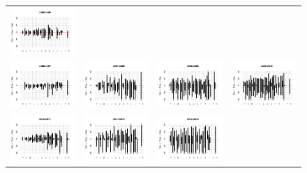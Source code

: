 \documentclass[letter,12pt]{article}
\begin{document}
\begin{figure}
\begin{center}
\begin{tabular}{cccc}
    \includegraphics[width=.22\columnwidth]{../graphs/urgenciasHistog2005.pdf} \\
    \includegraphics[width=.22\columnwidth]{../graphs/urgenciasHistog2006.pdf} &
    \includegraphics[width=.22\columnwidth]{../graphs/urgenciasHistog2007.pdf} &
    \includegraphics[width=.22\columnwidth]{../graphs/urgenciasHistog2008.pdf} &
    \includegraphics[width=.22\columnwidth]{../graphs/urgenciasHistog2009.pdf} \\
    \includegraphics[width=.22\columnwidth]{../graphs/urgenciasHistog2010.pdf} &
    \includegraphics[width=.22\columnwidth]{../graphs/urgenciasHistog2011.pdf} &
    \includegraphics[width=.22\columnwidth]{../graphs/urgenciasHistog2012.pdf} &

\end{tabular}
\end{center}
\end{figure}
\end{document}
